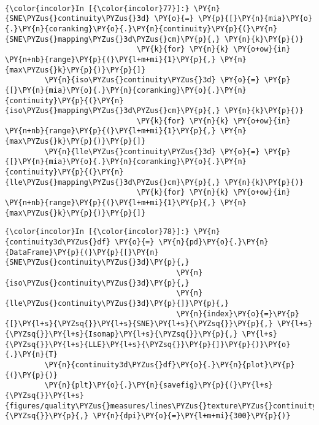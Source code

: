     \begin{center}
    \end{center}
    { \hspace*{\fill} \\}

    \begin{Verbatim}[commandchars=\\\{\}]
{\color{incolor}In [{\color{incolor}77}]:} \PY{n}{SNE\PYZus{}continuity\PYZus{}3d} \PY{o}{=} \PY{p}{[}\PY{n}{mia}\PY{o}{.}\PY{n}{coranking}\PY{o}{.}\PY{n}{continuity}\PY{p}{(}\PY{n}{SNE\PYZus{}mapping\PYZus{}3d\PYZus{}cm}\PY{p}{,} \PY{n}{k}\PY{p}{)}
                              \PY{k}{for} \PY{n}{k} \PY{o+ow}{in} \PY{n+nb}{range}\PY{p}{(}\PY{l+m+mi}{1}\PY{p}{,} \PY{n}{max\PYZus{}k}\PY{p}{)}\PY{p}{]}
         \PY{n}{iso\PYZus{}continuity\PYZus{}3d} \PY{o}{=} \PY{p}{[}\PY{n}{mia}\PY{o}{.}\PY{n}{coranking}\PY{o}{.}\PY{n}{continuity}\PY{p}{(}\PY{n}{iso\PYZus{}mapping\PYZus{}3d\PYZus{}cm}\PY{p}{,} \PY{n}{k}\PY{p}{)}
                              \PY{k}{for} \PY{n}{k} \PY{o+ow}{in} \PY{n+nb}{range}\PY{p}{(}\PY{l+m+mi}{1}\PY{p}{,} \PY{n}{max\PYZus{}k}\PY{p}{)}\PY{p}{]}
         \PY{n}{lle\PYZus{}continuity\PYZus{}3d} \PY{o}{=} \PY{p}{[}\PY{n}{mia}\PY{o}{.}\PY{n}{coranking}\PY{o}{.}\PY{n}{continuity}\PY{p}{(}\PY{n}{lle\PYZus{}mapping\PYZus{}3d\PYZus{}cm}\PY{p}{,} \PY{n}{k}\PY{p}{)}
                              \PY{k}{for} \PY{n}{k} \PY{o+ow}{in} \PY{n+nb}{range}\PY{p}{(}\PY{l+m+mi}{1}\PY{p}{,} \PY{n}{max\PYZus{}k}\PY{p}{)}\PY{p}{]}
\end{Verbatim}

    \begin{Verbatim}[commandchars=\\\{\}]
{\color{incolor}In [{\color{incolor}78}]:} \PY{n}{continuity3d\PYZus{}df} \PY{o}{=} \PY{n}{pd}\PY{o}{.}\PY{n}{DataFrame}\PY{p}{(}\PY{p}{[}\PY{n}{SNE\PYZus{}continuity\PYZus{}3d}\PY{p}{,}
                                       \PY{n}{iso\PYZus{}continuity\PYZus{}3d}\PY{p}{,}
                                       \PY{n}{lle\PYZus{}continuity\PYZus{}3d}\PY{p}{]}\PY{p}{,}
                                       \PY{n}{index}\PY{o}{=}\PY{p}{[}\PY{l+s}{\PYZsq{}}\PY{l+s}{SNE}\PY{l+s}{\PYZsq{}}\PY{p}{,} \PY{l+s}{\PYZsq{}}\PY{l+s}{Isomap}\PY{l+s}{\PYZsq{}}\PY{p}{,} \PY{l+s}{\PYZsq{}}\PY{l+s}{LLE}\PY{l+s}{\PYZsq{}}\PY{p}{]}\PY{p}{)}\PY{o}{.}\PY{n}{T}
         \PY{n}{continuity3d\PYZus{}df}\PY{o}{.}\PY{n}{plot}\PY{p}{(}\PY{p}{)}
         \PY{n}{plt}\PY{o}{.}\PY{n}{savefig}\PY{p}{(}\PY{l+s}{\PYZsq{}}\PY{l+s}{figures/quality\PYZus{}measures/lines\PYZus{}texture\PYZus{}continuity\PYZus{}3d.png}\PY{l+s}{\PYZsq{}}\PY{p}{,} \PY{n}{dpi}\PY{o}{=}\PY{l+m+mi}{300}\PY{p}{)}
\end{Verbatim}

